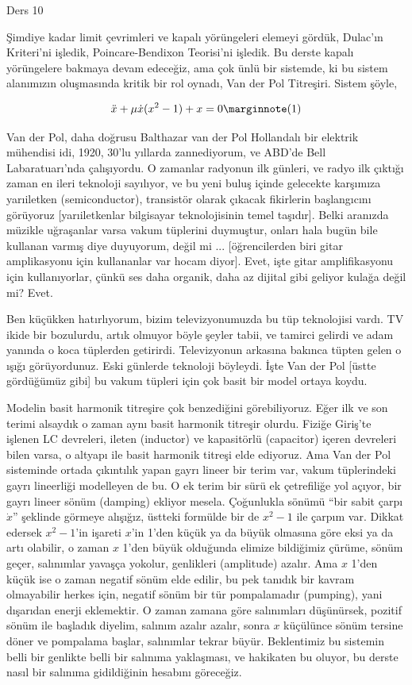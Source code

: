 \documentclass[12pt,fleqn]{article}\usepackage{../../common}
\begin{document}
Ders 10

Şimdiye kadar limit çevrimleri ve kapalı yörüngeleri elemeyi gördük, Dulac'ın
Kriteri'ni işledik, Poincare-Bendixon Teorisi'ni işledik. Bu derste kapalı
yörüngelere bakmaya devam edeceğiz, ama çok ünlü bir sistemde, ki bu sistem
alanımızın oluşmasında kritik bir rol oynadı, Van der Pol Titreşiri.
Sistem şöyle,

$$ \ddot{x} + \mu\dot{x} (x^2-1) + x = 0 
\mlabel{1}$$

Van der Pol, daha doğrusu Balthazar van der Pol Hollandalı bir elektrik
mühendisi idi, 1920, 30'lu yıllarda zannediyorum, ve ABD'de Bell Labaratuarı'nda
çalışıyordu. O zamanlar radyonun ilk günleri, ve radyo ilk çıktığı zaman en
ileri teknoloji sayılıyor, ve bu yeni buluş içinde gelecekte karşımıza
yarıiletken (semiconductor), transistör olarak çıkacak fikirlerin başlangıcını
görüyoruz [yarıiletkenlar bilgisayar teknolojisinin temel taşıdır]. Belki
aranızda müzikle uğraşanlar varsa vakum tüplerini duymuştur, onları hala bugün
bile kullanan varmış diye duyuyorum, değil mi ... [öğrencilerden biri gitar
  amplikasyonu için kullananlar var hocam diyor]. Evet, işte gitar
amplifikasyonu için kullanıyorlar, çünkü ses daha organik, daha az dijital gibi
geliyor kulağa değil mi? Evet.

Ben küçükken hatırlıyorum, bizim televizyonumuzda bu tüp teknolojisi vardı. TV
ikide bir bozulurdu, artık olmuyor böyle şeyler tabii, ve tamirci gelirdi ve
adam yanında o koca tüplerden getirirdi. Televizyonun arkasına bakınca tüpten
gelen o ışığı görüyordunuz. Eski günlerde teknoloji böyleydi. İşte Van der Pol
[üstte gördüğümüz gibi] bu vakum tüpleri için çok basit bir model ortaya koydu.

Modelin basit harmonik titreşire çok benzediğini görebiliyoruz. Eğer ilk ve son
terimi alsaydık o zaman aynı basit harmonik titreşir olurdu. Fiziğe Giriş'te
işlenen LC devreleri, ileten (inductor) ve kapasitörlü (capacitor) içeren
devreleri bilen varsa, o altyapı ile basit harmonik titreşi elde ediyoruz. Ama
Van der Pol sisteminde ortada çıkıntılık yapan gayrı lineer bir terim var, vakum
tüplerindeki gayrı lineerliği modelleyen de bu. O ek terim bir sürü ek
çetrefiliğe yol açıyor, bir gayrı lineer sönüm (damping) ekliyor
mesela. Çoğunlukla sönümü ``bir sabit çarpı $\dot{x}$'' şeklinde görmeye
alışığız, üstteki formülde bir de $x^2-1$ ile çarpım var. Dikkat edersek
$x^2-1$'in işareti $x$'in 1'den küçük ya da büyük olmasına göre eksi ya da artı
olabilir, o zaman $x$ 1'den büyük olduğunda elimize bildiğimiz çürüme, sönüm
geçer, salınımlar yavaşça yokolur, genlikleri (amplitude) azalır. Ama $x$ 1'den
küçük ise o zaman negatif sönüm elde edilir, bu pek tanıdık bir kavram
olmayabilir herkes için, negatif sönüm bir tür pompalamadır (pumping), yani
dışarıdan enerji eklemektir. O zaman zamana göre salınımları düşünürsek, pozitif
sönüm ile başladık diyelim, salınım azalır azalır, sonra $x$ küçülünce sönüm
tersine döner ve pompalama başlar, salınımlar tekrar büyür.  Beklentimiz bu
sistemin belli bir genlikte belli bir salınıma yaklaşması, ve hakikaten bu
oluyor, bu derste nasıl bir salınıma gidildiğinin hesabını göreceğiz.
\end{document}
